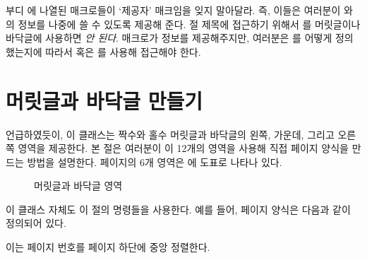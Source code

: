 \begin{plainlist}
부디 에 나열된 매크로들이 `제공자' 매크임을 잊지 말아달라.
즉, 이들은 여러분이 \cmd{\leftmark}와 \cmd{\rightmark}의 정보를 나중에 쓸 수
있도록 제공해 준다.
절 제목에 접근하기 위해서 \cmd{\sectionmark}를 머릿글이나 바닥글에 사용하면
\emph{안 된다}.
매크로가 정보를 제공해주지만, 여러분은 \cmd{\sectionmark}를 어떻게 정의했는지에
따라서 \cmd{\leftmark} 혹은 \cmd{\rightmark}를 사용해 접근해야 한다.


\section{머릿글과 바닥글 만들기}

언급하였듯이, 이 클래스는 짝수와 홀수 머릿글과
바닥글의 왼쪽, 가운데, 그리고 오른쪽 영역을 제공한다.
본 절은 여러분이 이 12개의 영역을 사용해 직접 페이지 양식을 만드는 방법을
설명한다.
페이지의 6개 영역은 에 도표로 나타나 있다.

\begin{figure}
\centering
\headerfooterdiagram
\caption{머릿글과 바닥글 영역}\label{lay:header}
\end{figure}

이 클래스 자체도 이 절의 명령들을 사용한다.
예를 들어,  페이지 양식은 다음과 같이 정의되어 있다.
\begin{lcode}
\end{lcode}
이는 페이지 번호를 페이지 하단에 중앙 정렬한다.



\end{plainlist}
